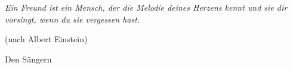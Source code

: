 \thispagestyle{empty}
\begin{center}
 \emph{Ein Freund ist ein Mensch, der die Melodie deines Herzens kennt und sie
       dir vorsingt, wenn du sie vergessen hast.}
 \begin{flushright}
 \footnotesize
 (nach Albert Einstein)
 \end{flushright}
\vspace{1cm} 
 \normalsize
 Den Sängern
\end{center}

\cleardoublepage
